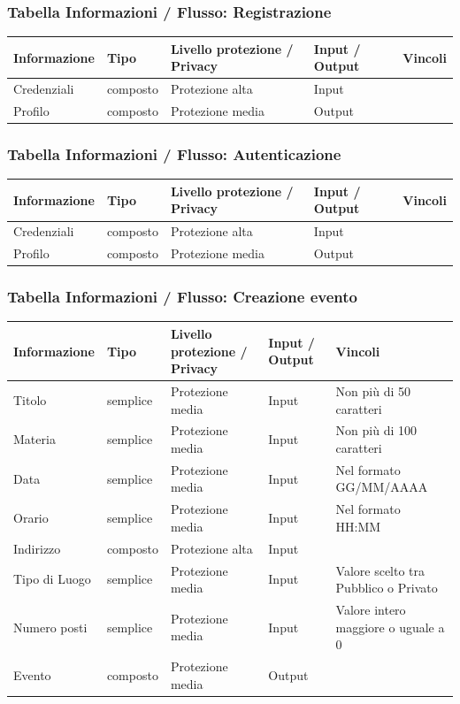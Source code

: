 \documentclass[12pt,a4paper]{report}
\begin{document}
\subsubsection{Tabella Informazioni / Flusso: Registrazione}
\begin{tabularx}{\textwidth}{|X|X|X|X|X|}
    \hline
    \rowcolor{studyColor} \textbf{Informazione} & \textbf{Tipo} & \textbf{Livello protezione / Privacy} & \textbf{Input / Output} & \textbf{Vincoli} \\ \hline
    \endhead
    Credenziali & composto & Protezione alta & Input & \\ \hline
    Profilo & composto & Protezione media & Output & \\ \hline
\end{tabularx}

\subsubsection{Tabella Informazioni / Flusso: Autenticazione}
\begin{tabularx}{\textwidth}{|X|X|X|X|X|}
    \hline
    \rowcolor{studyColor} \textbf{Informazione} & \textbf{Tipo} & \textbf{Livello protezione / Privacy} & \textbf{Input / Output} & \textbf{Vincoli} \\ \hline
    \endhead
    Credenziali & composto & Protezione alta & Input & \\ \hline
    Profilo & composto & Protezione media & Output & \\ \hline
\end{tabularx}

\subsubsection{Tabella Informazioni / Flusso: Creazione evento}
\begin{tabularx}{\textwidth}{|X|X|X|X|X|}
    \hline
    \rowcolor{studyColor} \textbf{Informazione} & \textbf{Tipo} & \textbf{Livello protezione / Privacy} & \textbf{Input / Output} & \textbf{Vincoli} \\ \hline
    \endhead
    Titolo & semplice & Protezione media & Input & Non più di 50 caratteri \\ \hline
    Materia & semplice & Protezione media & Input & Non più di 100 caratteri \\ \hline
    Data & semplice & Protezione media & Input & Nel formato GG/MM/AAAA \\ \hline
    Orario & semplice & Protezione media & Input & Nel formato HH:MM \\ \hline
    Indirizzo & composto & Protezione alta & Input & \\ \hline
    Tipo di Luogo & semplice & Protezione media & Input & Valore scelto tra Pubblico o Privato \\ \hline
    Numero posti & semplice & Protezione media & Input & Valore intero maggiore o uguale a 0 \\ \hline
    Evento & composto & Protezione media & Output & \\ \hline
\end{tabularx}
\end{document}
